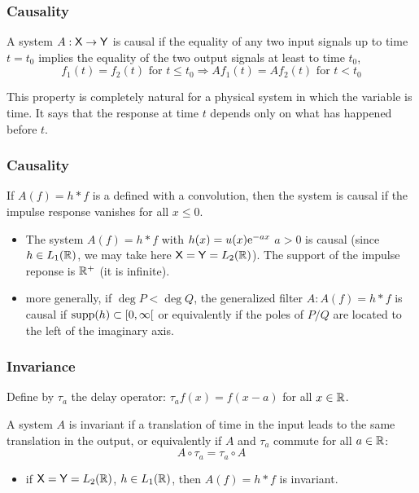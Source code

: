 \begin{frame}
\frametitle{Causality}
\begin{definition}
A system $A: \mathsf{X} \to \mathsf{Y}$ is \alert{causal} if the equality of any two input signals up to time $t=t_0$ implies the equality of the two output signals at least to time $t_0$,
$$
\text{$f_1(t)= f_2(t)$ for $t \leq t_0$} \Rightarrow \text{$A f_1(t)= A f_2(t)$ for $t < t_0$}
$$
\end{definition}
This property is completely natural for a physical system in which the
variable is time. It says that the response at time $t$ depends only on what
has happened before $t$.
\end{frame}

\begin{frame}
\frametitle{Causality}
\begin{theorem}
If $A(f)= h * f$ is a defined with a convolution, then the system is causal if the impulse response vanishes for all $x \leq 0$.
\end{theorem}
\begin{itemize}
\item The system $A(f)= h * f$ with $h(x)= u(x) \mathrm{e}^{-a x}$ $a > 0$ is causal (since $h \in L_1(\mathbb{R})$, we may take here $\mathsf{X}= \mathsf{Y}= L_2(\mathbb{R})$). The support of the impulse reponse is $\mathbb{R}^+$ (it is infinite).
\item more generally, if  $\deg P < \deg Q$, the generalized filter $A: A(f)= h * f$ is \alert{causal} if $\mathrm{supp}(h) \subset \left[0,\infty\right[$ or equivalently if the poles of $P/Q$ are located to the \alert{left of the imaginary axis}.
\end{itemize}
\end{frame}

\begin{frame}
\frametitle{Invariance}
Define by $\tau_a$ the \alert{delay operator}: $\tau_a f(x)= f(x-a)$ for all $x \in \mathbb{R}$.
\begin{definition}
A system $A$ is \alert{invariant} if a translation of time in the input leads to the same translation in the output, or equivalently
if $A$ and $\tau_a$ commute for all $a \in \mathbb{R}$:
\[
A \circ \tau_a = \tau_a \circ A
\]
\end{definition}
\begin{itemize}
\item if $\mathsf{X}= \mathsf{Y}= L_2(\mathbb{R})$, $h \in L_1(\mathbb{R})$, then $A(f)= h * f$ is invariant. 
\end{itemize}
\end{frame}

